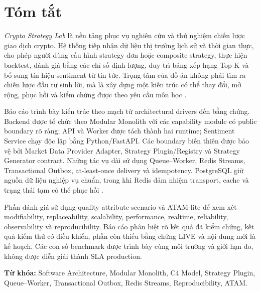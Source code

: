 \documentclass[12pt,a4paper,oneside]{report}
\newcommand{\project}{\textit{Crypto Strategy Lab}}
\begin{document}
\setcounter{page}{1}
\chapter*{Tóm tắt}

\project{} là nền tảng phục vụ nghiên cứu và thử nghiệm chiến lược giao dịch crypto. Hệ thống tiếp nhận dữ liệu thị trường lịch sử và thời gian thực, cho phép người dùng cấu hình strategy đơn hoặc composite strategy, thực hiện backtest, đánh giá bằng các chỉ số định lượng, duy trì bảng xếp hạng Top-K và bổ sung tín hiệu sentiment từ tin tức. Trọng tâm của đồ án không phải tìm ra chiến lược đầu tư sinh lời, mà là xây dựng một kiến trúc có thể thay đổi, mở rộng, phục hồi và kiểm chứng được theo yêu cầu môn học \cite{de-bai,slide-kien-truc}.

Báo cáo trình bày kiến trúc theo mạch từ architectural drivers đến bằng chứng. Backend được tổ chức theo Modular Monolith với các capability module có public boundary rõ ràng; API và Worker được tách thành hai runtime; Sentiment Service chạy độc lập bằng Python/FastAPI. Các boundary biến thiên được bảo vệ bởi Market Data Provider Adapter, Strategy Plugin/Registry và Strategy Generator contract. Những tác vụ dài sử dụng Queue--Worker, Redis Streams, Transactional Outbox, at-least-once delivery và idempotency. PostgreSQL giữ nguồn dữ liệu nghiệp vụ chuẩn, trong khi Redis đảm nhiệm transport, cache và trạng thái tạm có thể phục hồi \cite{fowler2002,postgresql-docs,redis-streams}.

Phần đánh giá sử dụng quality attribute scenario và ATAM-lite để xem xét modifiability, replaceability, scalability, performance, realtime, reliability, observability và reproducibility. Báo cáo phân biệt rõ kết quả đã kiểm chứng, kết quả kiểm thử có điều khiển, phần còn thiếu bằng chứng LIVE và nội dung mới là kế hoạch. Các con số benchmark được trình bày cùng môi trường và giới hạn đo, không được diễn giải thành SLA production.

\noindent\textbf{Từ khóa:} Software Architecture, Modular Monolith, C4 Model, Strategy Plugin, Queue--Worker, Transactional Outbox, Redis Streams, Reproducibility, ATAM.

\clearpage
\tableofcontents
\clearpage
{}
\listoffigures
\clearpage
{}
\listoftables
\clearpage
\end{document}
